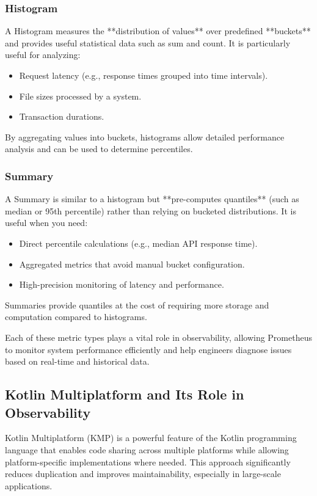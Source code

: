 \documentclass[a4paper,twoside,11pt]{article}
\begin{document}
\subsubsection{Histogram}
A Histogram measures the **distribution of values** over predefined **buckets** and provides useful statistical data such as sum and count. It is particularly useful for analyzing:
\begin{itemize}
    \item Request latency (e.g., response times grouped into time intervals).
    \item File sizes processed by a system.
    \item Transaction durations.
\end{itemize}
By aggregating values into buckets, histograms allow detailed performance analysis and can be used to determine percentiles.

\subsubsection{Summary}
A Summary is similar to a histogram but **pre-computes quantiles** (such as median or 95th percentile) rather than relying on bucketed distributions. It is useful when you need:
\begin{itemize}
    \item Direct percentile calculations (e.g., median API response time).
    \item Aggregated metrics that avoid manual bucket configuration.
    \item High-precision monitoring of latency and performance.
\end{itemize}
Summaries provide quantiles at the cost of requiring more storage and computation compared to histograms.

Each of these metric types plays a vital role in observability, allowing Prometheus to monitor system performance efficiently and help engineers diagnose issues based on real-time and historical data.

\subsection{Kotlin Multiplatform and Its Role in Observability}
Kotlin Multiplatform (KMP)\cite{kotlinmultiplatform:jetbrains} is a powerful feature of the Kotlin programming language that enables code sharing across multiple platforms while allowing platform-specific implementations where needed. This approach significantly reduces duplication and improves maintainability, especially in large-scale applications.
\end{document}
